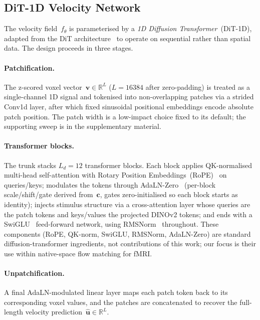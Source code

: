 \documentclass[runningheads]{llncs}
\begin{document}
\subsection{DiT-1D Velocity Network}
\label{sec:method-arch}

The velocity field~$f_\theta$ is parameterised by a \emph{1D Diffusion
Transformer}~(DiT-1D), adapted from the DiT architecture~\cite{dit} to operate on
sequential rather than spatial data.
The design proceeds in three stages.

\paragraph{Patchification.}
The z-scored voxel vector~$\mathbf{v} \in \mathbb{R}^{L}$ ($L = 16384$ after zero-padding) is
treated as a single-channel 1D signal and tokenised into non-overlapping patches via a strided
Conv1d layer, after which fixed sinusoidal positional embeddings encode absolute patch position.
The patch width is a low-impact choice fixed to its default; the supporting sweep is in the
supplementary material.

\paragraph{Transformer blocks.}
The trunk stacks $L_d = 12$ transformer blocks. Each block applies QK-normalised multi-head
self-attention with Rotary Position Embeddings~(RoPE)~\cite{su2024roformer} on
queries/keys; modulates the tokens through AdaLN-Zero~\cite{dit} (per-block scale/shift/gate
derived from~$\mathbf{c}$, gates zero-initialised so each block starts as identity); injects
stimulus structure via a cross-attention layer whose queries are the patch tokens and
keys/values the projected DINOv2 tokens; and ends with a SwiGLU~\cite{shazeer2020glu}
feed-forward network, using RMSNorm~\cite{zhang2019rms} throughout. These components (RoPE,
QK-norm, SwiGLU, RMSNorm, AdaLN-Zero) are standard diffusion-transformer ingredients, not
contributions of this work; our focus is their use within native-space flow matching for fMRI.

\paragraph{Unpatchification.}
A final AdaLN-modulated linear layer maps each patch token back to its corresponding voxel
values, and the patches are concatenated to recover the full-length velocity
prediction~$\hat{\mathbf{u}} \in \mathbb{R}^{L}$.
\end{document}
